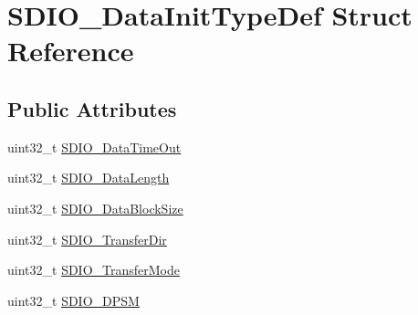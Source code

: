 \hypertarget{structSDIO__DataInitTypeDef}{
\section{SDIO\_\-DataInitTypeDef Struct Reference}
\label{structSDIO__DataInitTypeDef}
}
\subsection*{Public Attributes}
\begin{DoxyCompactItemize}
\item 
uint32\_\-t \hyperlink{structSDIO__DataInitTypeDef_a6877ec1042a273e228114e5362b93aa1}{SDIO\_\-DataTimeOut}
\item 
uint32\_\-t \hyperlink{structSDIO__DataInitTypeDef_ac325889a6dd582130a752aafc3ec9ee9}{SDIO\_\-DataLength}
\item 
uint32\_\-t \hyperlink{structSDIO__DataInitTypeDef_a2252d17c4b3182830eb9f400489cb10f}{SDIO\_\-DataBlockSize}
\item 
uint32\_\-t \hyperlink{structSDIO__DataInitTypeDef_a4838fffdb3f87850569dff12f15485db}{SDIO\_\-TransferDir}
\item 
uint32\_\-t \hyperlink{structSDIO__DataInitTypeDef_a58ac19aaaceb2791d4bbcd30f334dd21}{SDIO\_\-TransferMode}
\item 
uint32\_\-t \hyperlink{structSDIO__DataInitTypeDef_ad5eb5f3c6fd9e5d4a6664c5cf57d6b03}{SDIO\_\-DPSM}
\end{DoxyCompactItemize}


